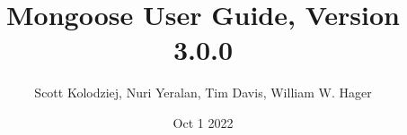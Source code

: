 \title{Mongoose User Guide, Version 3.0.0}
\author{Scott Kolodziej, Nuri Yeralan, Tim Davis, William W. Hager}
\date{Oct 1 2022}

